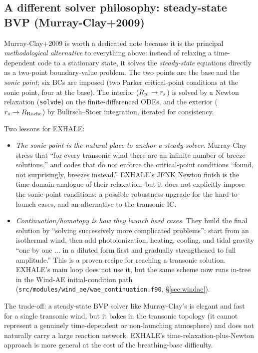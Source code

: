 \documentclass[english,a4paper]{my_memo}
\begin{document}
\subsection{A different solver philosophy: steady-state BVP
(Murray-Clay+2009)}
\label{sec:mc}

Murray-Clay+2009 is worth a dedicated note because it is the principal
\emph{methodological alternative} to everything above: instead of
relaxing a time-dependent code to a stationary state, it solves the
\emph{steady-state} equations directly as a two-point boundary-value
problem. The two points are the base and the \emph{sonic point}; six BCs
are imposed (two Parker critical-point conditions at the sonic point,
four at the base). The interior ($R_{\rm pl}\to r_s$) is solved by a
Newton relaxation (\texttt{solvde}) on the finite-differenced ODEs, and
the exterior ($r_s\to R_{\rm Roche}$) by Bulirsch--Stoer integration,
iterated for consistency.

Two lessons for EXHALE:
\begin{itemize}
\item \emph{The sonic point is the natural place to anchor a steady
  solver.} Murray-Clay stress that ``for every transonic wind there are
  an infinite number of breeze solutions,'' and codes that do not
  enforce the critical-point conditions ``found, not surprisingly,
  breezes instead.'' EXHALE's JFNK Newton finish is the time-domain
  analogue of their relaxation, but it does not explicitly impose the
  sonic-point conditions: a possible robustness upgrade for the
  hard-to-launch cases, and an alternative to the transonic IC.
\item \emph{Continuation/homotopy is how they launch hard cases.} They
  build the final solution by ``solving successively more complicated
  problems'': start from an isothermal wind, then add photoionization,
  heating, cooling, and tidal gravity ``one by one $\ldots$ in a diluted
  form first and gradually strengthened to full amplitude.'' This is a
  proven recipe for reaching a transonic solution. EXHALE's main loop does
  not use it, but the same scheme now runs in-tree in the Wind-AE
  initial-condition path
  (\texttt{src/modules/wind\_ae/wae\_continuation.f90}, \S\ref{sec:windae}).
\end{itemize}

The trade-off: a steady-state BVP solver like Murray-Clay's is elegant
and fast for a single transonic wind, but it bakes in the transonic
topology (it cannot represent a genuinely time-dependent or
non-launching atmosphere) and does not naturally carry a large reaction
network. EXHALE's time-relaxation-plus-Newton approach is more general
at the cost of the breathing-base difficulty.
\end{document}
